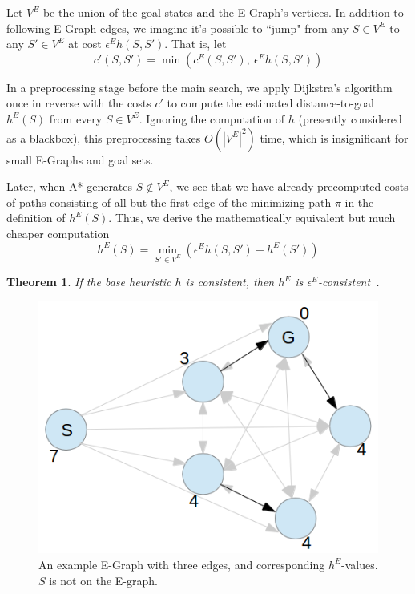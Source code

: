 \documentclass[letterpaper]{article}
\newtheorem{thm}{Theorem}
\begin{document}
Let $V^E$ be the union of the goal states and the E-Graph's vertices.
In addition to following E-Graph edges, we imagine it's possible to ``jump" from any $S\in V^E$ to any $S'\in V^E$ at cost $\epsilon^E h(S,S')$.
That is, let
\[c'(S,S') = \min\left(c^E(S,S'),~\epsilon^E h(S,S')\right)\]


In a preprocessing stage before the main search, we apply Dijkstra's algorithm once in reverse with the costs $c'$ to compute the estimated distance-to-goal $h^E(S)$ from every $S\in V^E$. Ignoring the computation of $h$ (presently considered as a blackbox), this preprocessing takes $O(|V^E|^2)$ time, which is insignificant for small E-Graphs and goal sets.

Later, when A* generates $S \notin V^E$, we see that we have already precomputed costs of paths consisting of all but the first edge of the minimizing path $\pi$ in the definition of $h^E(S)$. Thus, we derive the mathematically equivalent but much cheaper computation
\[h^E(S) = \min_{S'\in V^E} \left(\epsilon^E h(S,S') + h^E(S')\right)\]

\begin{thm} If the base heuristic $h$ is consistent, then $h^E$ is $\epsilon^E$-consistent~\cite{phillips2012graphs}.\end{thm}

\begin{figure}
	\begin{center}
	\includegraphics[scale=0.5]{Pentagon.png}
	\end{center}
	\caption{An example E-Graph with three edges, and corresponding $h^E$-values. $S$ is not on the E-graph.}
	\label{fig:example}
\end{figure}
\end{document}
